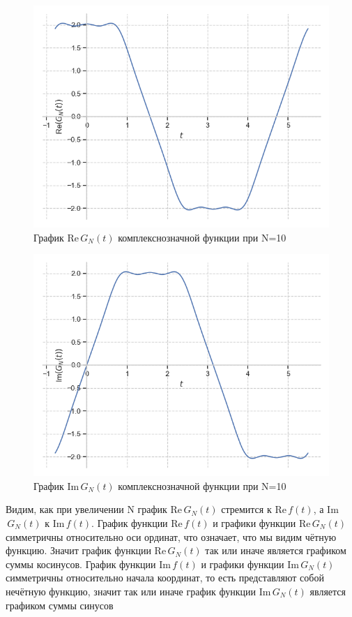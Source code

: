 \documentclass[a4paper, 16pt]{article}
\begin{document}
\begin{figure}[!htb]
    \centering
    \includegraphics[scale=0.8]{fourier_re_cfunc_n=10.png}
    \captionsetup{skip=0pt}
    \caption{График Re$\,G_N(t)$ комплекснозначной функции при N=10}
    \label{Рис:48}
\end{figure}
\begin{figure}[!htb]
    \centering
    \includegraphics[scale=0.8]{fourier_im_cfunc_n=10.png}
    \captionsetup{skip=0pt}
    \caption{График Im$\,G_N(t)$ комплекснозначной функции при N=10}
    \label{Рис:49}
\end{figure}


\noindent Видим, как при увеличении N график Re$\,G_N(t)$ стремится к Re$\,f(t)$,
а Im$\,G_N(t)$ к Im$\,f(t)$. График функции Re$\,f(t)$ и графики функции Re$\,G_N(t)$ симметричны 
относительно оси ординат, что означает, что мы видим чётную функцию. Значит
график функции Re$\,G_N(t)$ так или иначе является графиком суммы косинусов. График функции Im$\,f(t)$
и графики функции Im$\,G_N(t)$ симметричны относительно начала координат, то есть представляют собой
нечётную функцию, значит так или иначе график функции Im$\,G_N(t)$ является графиком суммы синусов
\end{document}
